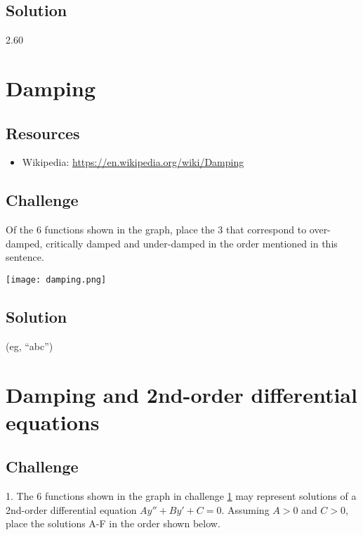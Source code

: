 \subsection*{Solution}
2.60

\timebox




\newpage
\section{Damping}
\label{sec:damping}

\subsection*{Resources}
\begin{itemize}
    \item Wikipedia: \url{https://en.wikipedia.org/wiki/Damping}
\end{itemize}

\subsection*{Challenge}
Of the 6 functions shown in the graph, place the 3 that correspond to over-damped, critically damped and under-damped in the order mentioned in this sentence.

\texttt{[image: damping.png]}

\subsection*{Solution}
(eg, ``abc'')


\timebox



\newpage
\section{Damping and 2nd-order differential equations} %

\subsection*{Challenge}
1. The 6 functions shown in the graph in challenge \ref{sec:damping} may represent solutions of a 2nd-order differential equation $Ay'' + By' + C = 0$. Assuming $A>0$ and $C>0$, place the solutions A-F in the order shown below.%

